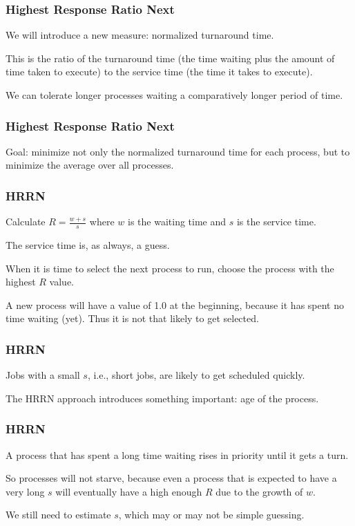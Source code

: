 \begin{frame}
\frametitle{Highest Response Ratio Next}

We will introduce a new measure: \alert{normalized turnaround time}. 

This is the ratio of the turnaround time (the time waiting plus the amount of time taken to execute) to the service time (the time it takes to execute). 

We can tolerate longer processes waiting a comparatively longer period of time. 

\end{frame}

\begin{frame}
\frametitle{Highest Response Ratio Next}

Goal: minimize not only the normalized turnaround time for each process, but to minimize the average over all processes.


\end{frame}

\begin{frame}
\frametitle{HRRN}

Calculate $R = \frac{w + s}{s}$ 
where $w$ is the waiting time and $s$ is the service time. 

The service time is, as always, a guess. 

When it is time to select the next process to run, choose the process with the highest $R$ value. 

A new process will have a value of 1.0 at the beginning, because it has spent no time waiting (yet). Thus it is not that likely to get selected.


\end{frame}

\begin{frame}
\frametitle{HRRN}

Jobs with a small $s$, i.e., short jobs, are likely to get scheduled quickly. 

The HRRN approach introduces something important: age of the process. 

\end{frame}

\begin{frame}
\frametitle{HRRN}

A process that has spent a long time waiting rises in priority until it gets a turn. 

So processes will not starve, because even a process that is expected to have a very long $s$ will eventually have a high enough $R$ due to the growth of $w$.

We still need to estimate $s$, which may or may not be simple guessing. 


\end{frame}

